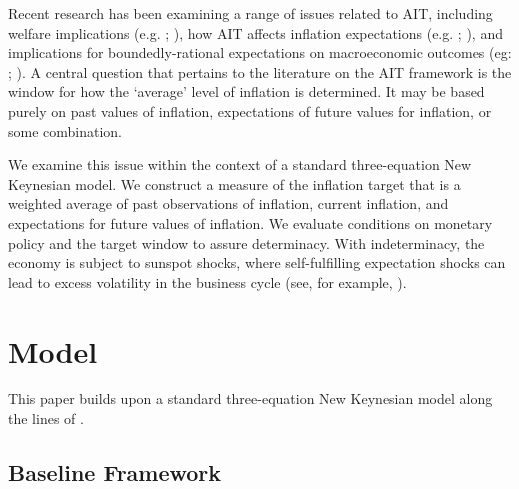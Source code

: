 \documentclass[english,authoryear,12pt]{elsarticle}
\begin{document}
Recent research has been examining a range of issues related to AIT, including welfare implications (e.g. \citealp{budianto2020}; \citealp{eo2020}), how AIT affects inflation expectations (e.g. \citealp{coibion2020}; \citealp{hoffmann2022}), and implications for boundedly-rational expectations on macroeconomic outcomes (eg: \citealp{honka2021}; \citealp{budianto2020}). A central question that pertains to the literature on the AIT framework is the window for how the `average' level of inflation is determined. It may be based purely on past values of inflation, expectations of future values for inflation, or some combination.

We examine this issue within the context of a standard three-equation New Keynesian model. We construct a measure of the inflation target that is a weighted average of past observations of inflation, current inflation, and expectations for future values of inflation. We evaluate conditions on monetary policy and the target window to assure determinacy. With indeterminacy, the economy is subject to sunspot shocks, where self-fulfilling expectation shocks can lead to excess volatility in the business cycle (see, for example, \citealp{lubik2004}).

\section{\label{Model}Model}
This paper builds upon a standard three-equation New Keynesian model along the lines of \cite{clarida1999}.

\subsection{Baseline Framework}
\end{document}
